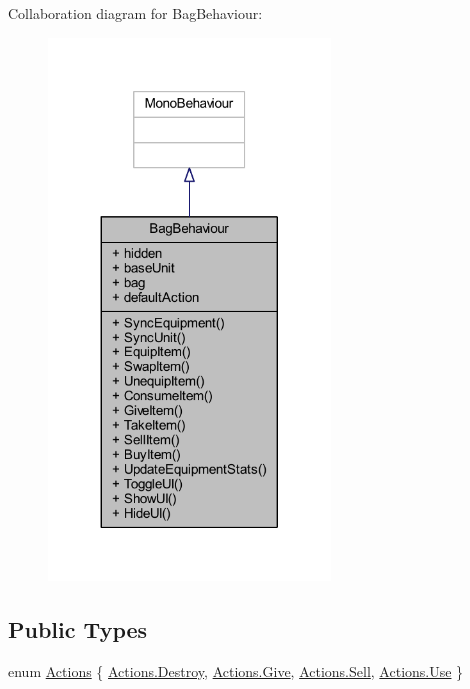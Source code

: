 Collaboration diagram for Bag\+Behaviour\+:
\nopagebreak
\begin{figure}[H]
\begin{center}
\leavevmode
\includegraphics[width=212pt]{class_bag_behaviour__coll__graph}
\end{center}
\end{figure}
\subsection*{Public Types}
\begin{DoxyCompactItemize}
\item 
enum \mbox{\hyperlink{class_bag_behaviour_aeafbbbda3c9a34d1a73647a8b274788c}{Actions}} \{ \mbox{\hyperlink{class_bag_behaviour_aeafbbbda3c9a34d1a73647a8b274788ca0e181f89f47654b86f3beb42f5cc08b8}{Actions.\+Destroy}}, 
\mbox{\hyperlink{class_bag_behaviour_aeafbbbda3c9a34d1a73647a8b274788ca2f355d9fa7accc561d3edc335de2fbcf}{Actions.\+Give}}, 
\mbox{\hyperlink{class_bag_behaviour_aeafbbbda3c9a34d1a73647a8b274788ca3068c5a98c003498f1fec0c489212e8b}{Actions.\+Sell}}, 
\mbox{\hyperlink{class_bag_behaviour_aeafbbbda3c9a34d1a73647a8b274788caad8783089f828b927473fb61d51940ec}{Actions.\+Use}}
 \}
\end{DoxyCompactItemize}
